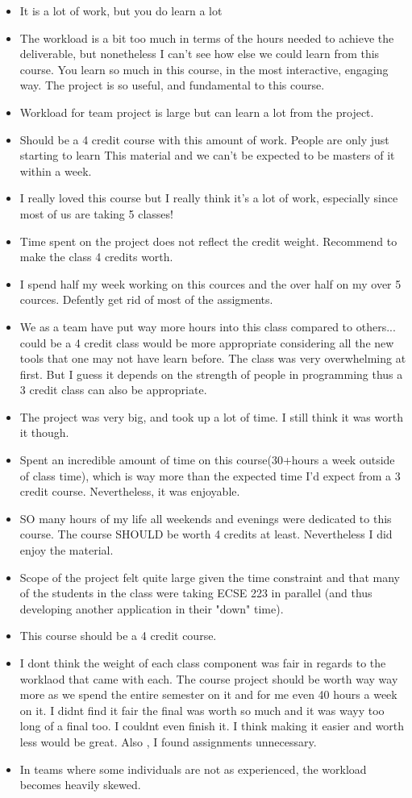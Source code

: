 \begin{itemize}
\item It is a lot of work, but you do learn a lot 
\item The workload is a bit too much in terms of the hours needed to achieve the deliverable, but nonetheless I can't see how else we could learn from this course. You learn so much in this course, in the most interactive, engaging way. The project is so useful, and fundamental to this course. 
\item Workload for team project is large but can learn a lot from the project. 
\item Should be a 4 credit course with this amount of work. People are only just starting to learn This material and we can't be expected to be masters of it within a week. 
\item I really loved this course but I really think it's a lot of work, especially since most of us are taking 5 classes! 
\item Time spent on the project does not reflect the credit weight. Recommend to make the class 4 credits worth. 
\item I spend half my week working on this cources and the over half on my over 5 cources. Defently get rid of most of the assigments. 
\item We as a team have put way more hours into this class compared to others... could be a 4 credit class would be more appropriate considering all the new tools that one may not have learn before. The class was very overwhelming at first. But I guess it depends on the strength of people in programming thus a 3 credit class can also be appropriate. 
\item The project was very big, and took up a lot of time. I still think it was worth it though. 
\item Spent an incredible amount of time on this course(30+hours a week outside of class time), which is way more than the expected time I'd expect from a 3 credit course. Nevertheless, it was enjoyable. 
\item SO many hours of my life all weekends and evenings were dedicated to this course. The course SHOULD be worth 4 credits at least. Nevertheless I did enjoy the material. 
\item Scope of the project felt quite large given the time constraint and that many of the students in the class were taking ECSE 223 in parallel (and thus developing another application in their "down" time). 
\item This course should be a 4 credit course. 
\item I dont think the weight of each class component was fair in regards to the worklaod that came with each. The course project should be worth way way more as we spend the entire semester on it and for me even 40 hours a week on it. I didnt find it fair the final was worth so much and it was wayy too long of a final too. I couldnt even finish it. I think making it easier and worth less would be great. Also , I found assignments unnecessary. 
\item In teams where some individuals are not as experienced, the workload becomes heavily skewed. 
\end{itemize}

